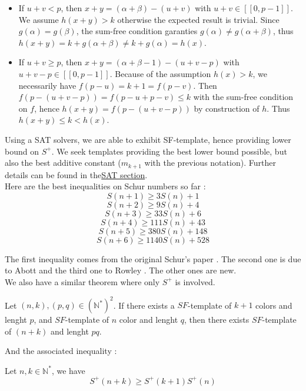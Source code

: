 \begin{itemize}
\item If \(u+v < p\), then \(x+y = (\alpha+\beta) - (u+v) \) with \(u+v \in [\![0,p-1]\!] \).
We assume \(h(x+y) > k\) otherwise the expected result is trivial.
Since \(g(\alpha) = g(\beta)\), the sum-free condition garanties \(g(\alpha) \neq g(\alpha+\beta)\), 
thus \(h(x+y) = k + g(\alpha + \beta) \neq k + g(\alpha) = h(x)\).
\item If \(u+v \geqslant p\), then \(x+y = (\alpha+\beta-1) - (u+v-p) \) with \(u+v-p \in [\![0,p-1]\!] \).
Because of the assumption \(h(x) > k\), we necessarily have \(f(p-u) = k+1 = f(p-v)\). 
Then \(f(p-(u+v-p)) = f(p-u + p-v) \leqslant k \) with the sum-free condition on \(f\), 
hence \(h(x+y) = f(p-(u+v-p)) \) by construction of \(h\). Thus \(h(x+y) \leqslant k < h(x)\).
\end{itemize}


Using a SAT solvers, we are able to exhibit SF-template, hence providing lower bound on \(S^+\). 
We seek templates providing the best lower bound possible, but also the best additive constant (\(m_{k+1}\) with the previous notation). 
Further details can be found in the\hyperref[SAT]{SAT section}. \\

Here are the best inequalities on Schur numbers so far :
\[ S(n+1) \geqslant 3S(n) + 1 \]
\[ S(n+2) \geqslant 9S(n) + 4 \]
\[ S(n+3) \geqslant 33S(n) + 6 \]
\[ S(n+4) \geqslant 111S(n) + 43 \]
\[ S(n+5) \geqslant 380S(n) + 148 \]
\[ S(n+6) \geqslant 1140S(n) + 528 \]

The first inequality comes from the original Schur's paper \cite{Schur1917}. The second one is due to
Abott \cite{AbbottHanson}
and the third one to Rowley \cite{RowleyRamsey}. The other ones are new. \\

We also have a similar theorem where only \(S^+\) is involved.

\begin{theorem}
	Let \((n,k), (p,q) \in (\mathbb{N}^*)^2\). If there exists a \(SF\)-template of \(k+1\) colors and lenght \(p\),
	and \(SF\)-template of \(n\) color and lenght \(q\), then there exists \(SF\)-template of \((n+k)\) and lenght \(pq\).
\end{theorem}

And the associated inequality :

\begin{corollary}
	Let \(n, k \in \mathbb{N}^*\), we have \\
	\[ S^+(n+k) \geqslant S^+(k+1)S^+(n) \]
\end{corollary}


